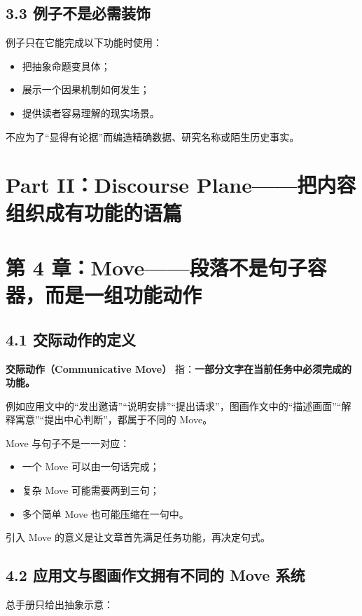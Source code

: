 \documentclass[11pt,a4paper]{ctexart}
\newcommand{\kw}[1]{\textbf{#1}}
\newcommand{\term}[2]{\textbf{#1（#2）}}
\begin{document}
\subsection{3.3 例子不是必需装饰}
例子只在它能完成以下功能时使用：
\begin{itemize}
  \item 把抽象命题变具体；
  \item 展示一个因果机制如何发生；
  \item 提供读者容易理解的现实场景。
\end{itemize}

不应为了“显得有论据”而编造精确数据、研究名称或陌生历史事实。

\newpage
\section{Part II：Discourse Plane——把内容组织成有功能的语篇}

\section{第 4 章：Move——段落不是句子容器，而是一组功能动作}

\subsection{4.1 交际动作的定义}
\term{交际动作}{Communicative Move} 指：\kw{一部分文字在当前任务中必须完成的功能。}

例如应用文中的“发出邀请”“说明安排”“提出请求”，图画作文中的“描述画面”“解释寓意”“提出中心判断”，都属于不同的 Move。

Move 与句子不是一一对应：
\begin{itemize}
  \item 一个 Move 可以由一句话完成；
  \item 复杂 Move 可能需要两到三句；
  \item 多个简单 Move 也可能压缩在一句中。
\end{itemize}

引入 Move 的意义是让文章首先满足任务功能，再决定句式。

\subsection{4.2 应用文与图画作文拥有不同的 Move 系统}
总手册只给出抽象示意：
\end{document}
